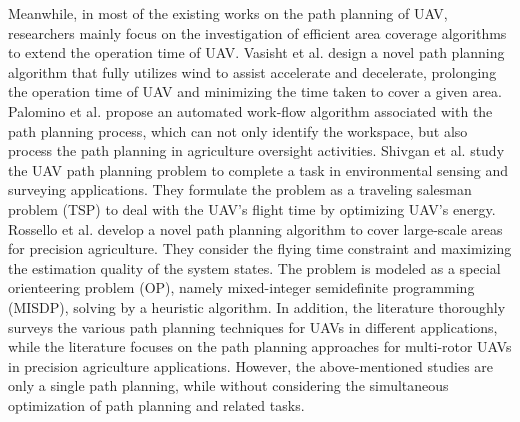 \documentclass[preprint,5pt]{elsarticle}
\begin{document}
Meanwhile, in most of the existing works on the path planning of UAV, researchers mainly focus on the investigation of efficient area coverage algorithms to extend the operation time of UAV. Vasisht et al. \cite{vasisht2017farmbeats} design a novel path planning algorithm that fully utilizes wind to assist accelerate and decelerate, prolonging the operation time of UAV and minimizing the time taken to cover a given area. Palomino et al. \cite{palomino2019towards} propose an automated work-flow algorithm associated with the path planning process, which can not only identify the workspace, but also process the path planning in agriculture oversight activities. Shivgan et al. \cite{shivgan2020energy} study the UAV path planning problem to complete a task in environmental sensing and surveying applications. They formulate the problem as a traveling salesman problem (TSP) to deal with the UAV's flight time by optimizing UAV's energy.
Rossello et al. \cite{rossello2021information} develop a novel path planning algorithm to cover large-scale areas for precision agriculture. They consider the flying time constraint and maximizing the estimation quality of the system states. The problem is modeled as a special orienteering problem (OP), namely mixed-integer semidefinite programming (MISDP), solving by a heuristic algorithm.
In addition, the literature \cite{aggarwal2020path} thoroughly surveys the various path planning techniques for UAVs in different applications, while the literature \cite{basiri2022survey} focuses on the path planning approaches for multi-rotor UAVs in precision agriculture applications. However, the above-mentioned studies are only a single path planning, while without considering the simultaneous optimization of path planning and related tasks.
\vspace{-0.10in}
\end{document}

